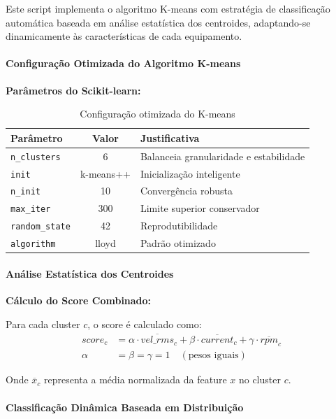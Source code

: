 Este script implementa o algoritmo K-means com estratégia de classificação automática baseada em análise estatística dos centroides, adaptando-se dinamicamente às características de cada equipamento.

\paragraph{Configuração Otimizada do Algoritmo K-means}

\textbf{Parâmetros do Scikit-learn:}

\begin{table}[H]
\centering
\caption{Configuração otimizada do K-means}
\begin{tabular}{|l|c|l|}
\hline
\textbf{Parâmetro} & \textbf{Valor} & \textbf{Justificativa} \\
\hline
\texttt{n\_clusters} & 6 & Balanceia granularidade e estabilidade \\
\texttt{init} & k-means++ & Inicialização inteligente \\
\texttt{n\_init} & 10 & Convergência robusta \\
\texttt{max\_iter} & 300 & Limite superior conservador \\
\texttt{random\_state} & 42 & Reprodutibilidade \\
\texttt{algorithm} & lloyd & Padrão otimizado \\
\hline
\end{tabular}
\end{table}

\paragraph{Análise Estatística dos Centroides}

\textbf{Cálculo do Score Combinado:}

Para cada cluster $c$, o score é calculado como:
\begin{align}
score_c &= \alpha \cdot \overline{vel\_rms}_c + \beta \cdot \overline{current}_c + \gamma \cdot \overline{rpm}_c \\
\alpha &= \beta = \gamma = 1 \quad (\text{pesos iguais})
\end{align}

Onde $\overline{x}_c$ representa a média normalizada da feature $x$ no cluster $c$.

\paragraph{Classificação Dinâmica Baseada em Distribuição}

